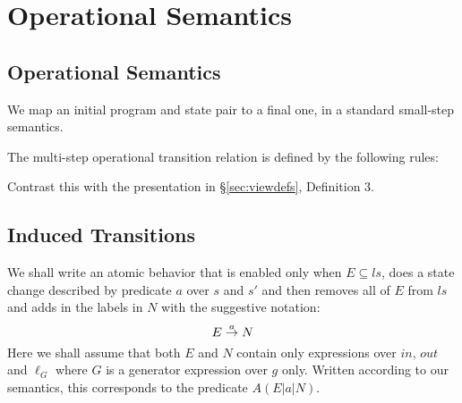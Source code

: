 \section{Operational Semantics}\label{sec:operational}

\subsection{Operational Semantics}

We map an initial program and state pair to a final one,
in a standard small-step semantics.

The multi-step operational transition relation
is defined by the following rules:

Contrast this with the presentation in \S\ref{sec:viewdefs}, Definition 3.


\subsection{Induced Transitions}

We shall write an atomic behavior
that is enabled only when $E \subseteq ls$,
does a state change described by predicate $a$ over $s$ and $s'$
and then removes all of $E$ from $ls$ and adds in the labels in $N$
with the suggestive notation:
\[
 E \stackrel{a}{\rightarrow} N
\]
Here we shall assume that both $E$ and $N$
contain only expressions over $in$, $out$ and $\ell_G$
where $G$ is a generator expression over $g$ only.
Written according to our semantics,
this corresponds to the predicate
$A(E|a|N)$.

